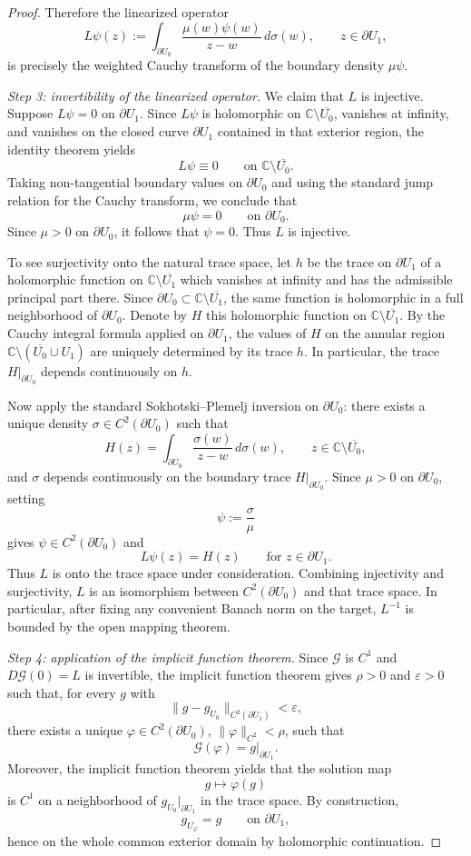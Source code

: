 \documentclass[a4paper,11pt,reqno]{amsart}
\numberwithin{equation}{section}
\theoremstyle{plain} %
\theoremstyle{definition} %
\theoremstyle{remark}
\newcommand{\C}{\mathbb{C}}
\begin{document}
\begin{proof}
Therefore the linearized operator
\[
L\psi(z):=\int_{\partial U_0}\frac{\mu(w)\psi(w)}{z-w}\,d\sigma(w),
\qquad z\in \partial U_1,
\]
is precisely the weighted Cauchy transform of the boundary density \(\mu\psi\).

\medskip
\noindent\emph{Step 3: invertibility of the linearized operator.}
We claim that \(L\) is injective. Suppose \(L\psi=0\) on \(\partial U_1\). Since
\(L\psi\) is holomorphic on \(\C\setminus \overline{U_0}\), vanishes at infinity,
and vanishes on the closed curve \(\partial U_1\) contained in that exterior
region, the identity theorem yields
\[
L\psi\equiv 0
\qquad \text{on }\C\setminus \overline{U_0}.
\]
Taking non-tangential boundary values on \(\partial U_0\) and using the standard
jump relation for the Cauchy transform, we conclude that
\[
\mu\psi=0
\qquad \text{on }\partial U_0.
\]
Since \(\mu>0\) on \(\partial U_0\), it follows that \(\psi=0\). Thus \(L\) is
injective.

To see surjectivity onto the natural trace space, let \(h\) be the trace on
\(\partial U_1\) of a holomorphic function on \(\C\setminus \overline{U_1}\)
which vanishes at infinity and has the admissible principal part there. Since
\(\partial U_0\subset \C\setminus \overline{U_1}\), the same function is
holomorphic in a full neighborhood of \(\partial U_0\). Denote by \(H\) this
holomorphic function on \(\C\setminus \overline{U_1}\). By the Cauchy integral
formula applied on \(\partial U_1\), the values of \(H\) on the annular region
\(\C\setminus (\overline{U_0}\cup U_1)\) are uniquely determined by its trace
\(h\). In particular, the trace \(H|_{\partial U_0}\) depends continuously on
\(h\).

Now apply the standard Sokhotski--Plemelj inversion on \(\partial U_0\): there
exists a unique density \(\sigma\in C^2(\partial U_0)\) such that
\[
H(z)=\int_{\partial U_0}\frac{\sigma(w)}{z-w}\,d\sigma(w),
\qquad z\in \C\setminus \overline{U_0},
\]
and \(\sigma\) depends continuously on the boundary trace \(H|_{\partial U_0}\).
Since \(\mu>0\) on \(\partial U_0\), setting
\[
\psi:=\frac{\sigma}{\mu}
\]
gives \(\psi\in C^2(\partial U_0)\) and
\[
L\psi(z)=H(z)
\qquad \text{for }z\in \partial U_1.
\]
Thus \(L\) is onto the trace space under consideration. Combining injectivity
and surjectivity, \(L\) is an isomorphism between
\(C^2(\partial U_0)\) and that trace space. In particular, after fixing any
convenient Banach norm on the target, \(L^{-1}\) is bounded by the open mapping
theorem.

\medskip
\noindent\emph{Step 4: application of the implicit function theorem.}
Since \(\mathcal G\) is \(C^1\) and \(D\mathcal G(0)=L\) is invertible, the
implicit function theorem gives \(\rho>0\) and \(\varepsilon>0\) such that, for
every \(g\) with
\[
\|g-g_{U_0}\|_{C^2(\partial U_1)}<\varepsilon,
\]
there exists a unique \(\varphi\in C^2(\partial U_0)\), \(\|\varphi\|_{C^2}<\rho\),
such that
\[
\mathcal G(\varphi)=g|_{\partial U_1}.
\]
Moreover, the implicit function theorem yields that the solution map
\[
g\mapsto \varphi(g)
\]
is \(C^1\) on a neighborhood of \(g_{U_0}|_{\partial U_1}\) in the trace space.
By construction,
\[
g_{U_\varphi}=g
\qquad \text{on }\partial U_1,
\]
hence on the whole common exterior domain by holomorphic continuation.


\end{proof}
\end{document}

